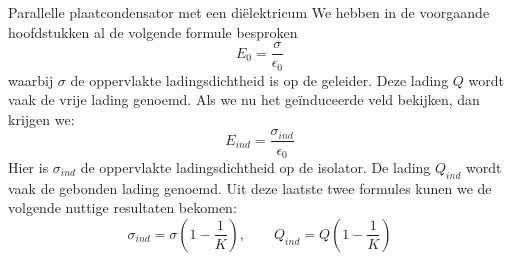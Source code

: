 \begin{app}{Parallelle plaatcondensator met een diëlektricum}
    We hebben in de voorgaande hoofdstukken al de volgende formule besproken
    \begin{equation*}
        E_0 = \dfrac{\sigma}{\epsilon_0}
    \end{equation*}
    waarbij $\sigma$ de oppervlakte ladingsdichtheid is op de geleider. Deze lading $Q$ wordt vaak de vrije lading genoemd.
    Als we nu het geïnduceerde veld bekijken, dan krijgen we:
    \begin{equation*}
        E_{ind} = \dfrac{\sigma_{ind}}{\epsilon_0}
    \end{equation*}
    Hier is $\sigma_{ind}$ de oppervlakte ladingsdichtheid op de isolator. De lading $Q_{ind}$ wordt vaak de gebonden lading genoemd. Uit deze laatste twee formules kunen we de volgende nuttige resultaten bekomen:
    \begin{equation*}
            \sigma_{ind} = \sigma(1-\dfrac{1}{K}), \qquad Q_{ind} = Q(1-\dfrac{1}{K})
    \end{equation*}
\end{app}



